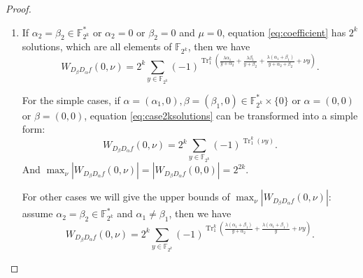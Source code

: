 \documentclass{article}
\newcommand{\F}{\mathbb{F}}
\newcommand{\0}{\textbf{0}}
\newcommand{\1}{\textbf{1}}
\newcommand{\TRACE}{\operatorname{Tr}_1^k}
\theoremstyle{plain}
\theoremstyle{nonumberplain}
\begin{document}
\begin{proof}
    
    \begin{enumerate}[label=\textbf{Case \arabic*}]
        \item If $ \alpha_2=\beta_2\in\F_{2^k}^* $ or $ \alpha_2=0 $ or $ \beta_2=0 $ 
    and $ \mu=0 $, equation \eqref{eq:coefficient} has $ 2^k $ solutions, 
    which are all elements of $ \F_{2^k} $, 
    then we have 
    \begin{equation}\label{eq:case2ksolutions}
        W_{D_{\beta}D_{\alpha}f}(0,\nu)=2^k\sum_{y\in\F_{2^k}}(-1)^{\TRACE\left(\frac{\lambda\alpha_1}{y+\alpha_2}+\frac{\lambda\beta_1}{y+\beta_2}+\frac{\lambda(\alpha_1+\beta_1)}{y+\alpha_2+\beta_2}+\nu y\right)}.
    \end{equation}

    
    For the simple cases, if $ \alpha=(\alpha_1,0),\beta=(\beta_1,0)\in\F_{2^k}^*\times\{0\} $ 
    or $ \alpha=(0,0) $ or $ \beta=(0,0) $, equation \eqref{eq:case2ksolutions} can be transformed into a simple form:
    \[W_{D_{\beta}D_{\alpha}f}(0,\nu)=2^k\sum_{y\in\F_{2^k}}(-1)^{\TRACE\left(\nu y\right)}.\]
    And $ \max_{\nu}|W_{D_{\beta}D_{\alpha}f}(0,\nu)|=|W_{D_{\beta}D_{\alpha}f}(0,0)|=2^{2k} $.

    For other cases we will give the upper bounds of 
    $ \max_{\nu}|W_{D_{\beta}D_{\alpha}f}(0,\nu)| $: assume 
    $ \alpha_2=\beta_2\in\F_{2^k}^* $ and $ \alpha_1\ne\beta_1 $, then we have 
    \[ W_{D_{\beta}D_{\alpha}f}(0,\nu)=2^k\sum_{y\in\F_{2^k}}(-1)^{\TRACE\left(\frac{\lambda(\alpha_1+\beta_1)}{y+\alpha_2}+\frac{\lambda(\alpha_1+\beta_1)}{y}+\nu y\right)}.\]


\end{enumerate}
\end{proof}
\end{document}
